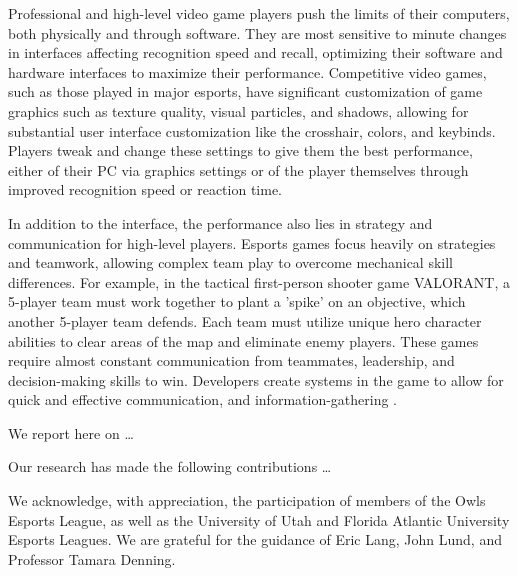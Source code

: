 \documentclass[sigconf]{acmart}
\begin{document}
Professional and high-level video game players push the limits of their computers, both physically and through software. They are most sensitive to minute changes in interfaces affecting recognition speed and recall, optimizing their software and hardware interfaces to maximize their performance. Competitive video games, such as those played in major esports, have significant customization of game graphics such as texture quality, visual particles, and shadows, allowing for substantial user interface customization like the crosshair, colors, and keybinds. Players tweak and change these settings to give them the best performance, either of their PC via graphics settings or of the player themselves through improved recognition speed or reaction time. 

In addition to the interface, the performance also lies in strategy and communication for high-level players. Esports games focus heavily on strategies and teamwork, allowing complex team play to overcome mechanical skill differences. For example, in the tactical first-person shooter game VALORANT, a 5-player team must work together to plant a 'spike' on an objective, which another 5-player team defends. Each team must utilize unique hero character abilities to clear areas of the map and eliminate enemy players. These games require almost constant communication from teammates, leadership, and decision-making skills to win. Developers create systems in the game to allow for quick and effective communication, and information-gathering \cite{Alharthi2018}. 

We report here on \dots

Our research has made the following contributions \dots


\begin{acks} 
    We acknowledge, with appreciation, the participation of members of the Owls Esports League, as well as the University of Utah and Florida Atlantic University Esports Leagues. We are grateful for the guidance of Eric Lang, John Lund, and Professor Tamara Denning. 
\end{acks}



\end{document}
